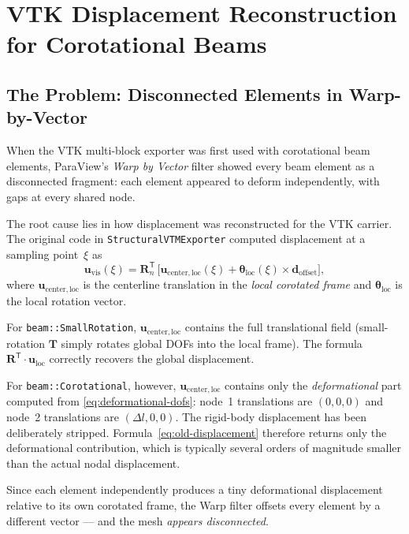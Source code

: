 \section{VTK Displacement Reconstruction for Corotational Beams}
\label{sec:vtk-displacement-fix}

\subsection{The Problem: Disconnected Elements in Warp-by-Vector}

When the VTK multi-block exporter was first used with corotational beam
elements, ParaView's \emph{Warp by Vector} filter showed every beam
element as a disconnected fragment: each element appeared to deform
independently, with gaps at every shared node.

The root cause lies in how displacement was reconstructed for the VTK
carrier.  The original code in \texttt{StructuralVTMExporter} computed
displacement at a sampling point~$\xi$ as
\begin{equation}\label{eq:old-displacement}
  \mathbf{u}_\mathrm{vis}(\xi)
  = \mathbf{R}_n^{\mathsf{T}} \,
    \bigl[\mathbf{u}_\mathrm{center,loc}(\xi)
    + \bm{\theta}_\mathrm{loc}(\xi) \times \mathbf{d}_\mathrm{offset}\bigr],
\end{equation}
where $\mathbf{u}_\mathrm{center,loc}$ is the centerline translation in the
\emph{local corotated frame} and $\bm{\theta}_\mathrm{loc}$ is the local
rotation vector.

For \texttt{beam::SmallRotation}, $\mathbf{u}_\mathrm{center,loc}$ contains
the full translational field (small-rotation $\mathbf{T}$ simply rotates
global DOFs into the local frame).  The formula
$\mathbf{R}^{\mathsf{T}} \cdot \mathbf{u}_\mathrm{loc}$ correctly recovers the
global displacement.

For \texttt{beam::Corotational}, however,
$\mathbf{u}_\mathrm{center,loc}$ contains only the \emph{deformational}
part computed from \cref{eq:deformational-dofs}: node~1 translations are
$(0,0,0)$ and node~2 translations are $(\Delta l, 0, 0)$.  The
rigid-body displacement has been deliberately stripped.
Formula~\eqref{eq:old-displacement} therefore returns only the
deformational contribution, which is typically several orders of
magnitude smaller than the actual nodal displacement.

Since each element independently produces a tiny deformational
displacement relative to its own corotated frame, the Warp filter offsets
every element by a different vector --- and the mesh \emph{appears
disconnected}.

